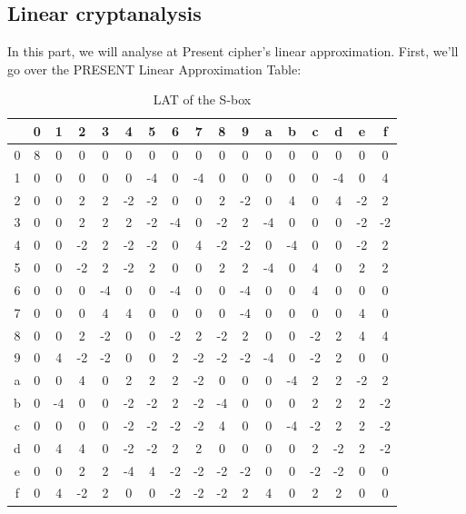 \documentclass[journal=tosc,preprint]{iacrtrans}
\begin{document}
\subsection{Linear cryptanalysis}
In this part, we will analyse at Present cipher's linear approximation. First, we'll go over the PRESENT Linear Approximation Table:\\
\begin{table}[h!]
	\centering
	\caption{LAT of the S-box}
	\begin{tabular}{ |c||c|c|c|c|c|c|c|c|c|c|c|c|c|c|c|c| }
		\hline
		& 0 & 1 & 2 & 3&4& 5& 6&7&8&9&a&b&c&d&e&f  \\ \hline \hline
		0& 8 & 0 & 0 & 0 & 0 & 0 & 0 & 0 & 0 & 0 & 0 & 0 & 0 & 0 & 0 & 0 \\ 
		1& 0 & 0 & 0 & 0 & 0 & -4 & 0 & -4 & 0 & 0 & 0 & 0 & 0 & -4 & 0 & 4 \\
		2& 0 & 0 & 2 & 2 & -2 & -2 & 0 & 0 & 2 & -2 & 0 & 4 & 0 & 4 & -2 & 2 \\
		3& 0 & 0 & 2 & 2 & 2 & -2 & -4 & 0 & -2 & 2 & -4 & 0 & 0 & 0 & -2 & -2 \\
		4& 0 & 0 & -2 & 2 & -2 & -2 & 0 & 4 & -2 & -2 & 0 & -4 & 0 & 0 & -2 & 2 \\
		5& 0 & 0 & -2 & 2 & -2 & 2 & 0 & 0 & 2 & 2 & -4 & 0 & 4 & 0 & 2 & 2\\
		6& 0 & 0 & 0 & -4 & 0 & 0 & -4 & 0 & 0 & -4 & 0 & 0 & 4 & 0 & 0 & 0\\
		7& 0 & 0 & 0 & 4 & 4 & 0 & 0 & 0 & 0 & -4 & 0 & 0 & 0 & 0 & 4 & 0\\
		8& 0 & 0 & 2 & -2 & 0 & 0 & -2 & 2 & -2 & 2 & 0 & 0 & -2 & 2 & 4 & 4\\
		9& 0 & 4 & -2 & -2 & 0 & 0 & 2 & -2 & -2 & -2 & -4 & 0 & -2 & 2 & 0 & 0\\
		a& 0 & 0 & 4 & 0 & 2 & 2 & 2 & -2 & 0 & 0 & 0 & -4 & 2 & 2 & -2 & 2\\
		b& 0 & -4 & 0 & 0 & -2 & -2 & 2 & -2 & -4 & 0 & 0 & 0 & 2 & 2 & 2 & -2\\
		c& 0 & 0 & 0 & 0 & -2 & -2 & -2 & -2 & 4 & 0 & 0 & -4 & -2 & 2 & 2 & -2\\
		d& 0 & 4 & 4 & 0 & -2 & -2 & 2 & 2 & 0 & 0 & 0 & 0 & 2 & -2 & 2 & -2\\
		e& 0 & 0 & 2 & 2 & -4 & 4 & -2 & -2 & -2 & -2 & 0 & 0 & -2 & -2 & 0 & 0\\
		f& 0 & 4 & -2 & 2 & 0 & 0 & -2 & -2 & -2 & 2 & 4 & 0 & 2 & 2 & 0 & 0\\
		\hline
	\end{tabular}
\end{table}\\
\end{document}
